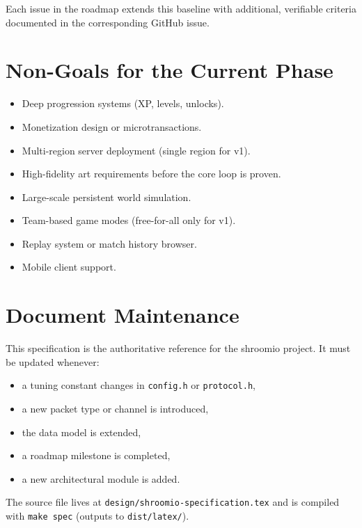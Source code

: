 \documentclass[11pt]{article}
\begin{document}
\noindent Each issue in the roadmap extends this baseline with additional, verifiable criteria documented in the corresponding GitHub issue.

\section{Non-Goals for the Current Phase}

\begin{itemize}
  \item Deep progression systems (XP, levels, unlocks).
  \item Monetization design or microtransactions.
  \item Multi-region server deployment (single region for v1).
  \item High-fidelity art requirements before the core loop is proven.
  \item Large-scale persistent world simulation.
  \item Team-based game modes (free-for-all only for v1).
  \item Replay system or match history browser.
  \item Mobile client support.
\end{itemize}

\section{Document Maintenance}

This specification is the authoritative reference for the shroomio project. It must be updated whenever:

\begin{itemize}
  \item a tuning constant changes in \texttt{config.h} or \texttt{protocol.h},
  \item a new packet type or channel is introduced,
  \item the data model is extended,
  \item a roadmap milestone is completed,
  \item a new architectural module is added.
\end{itemize}

\noindent The source file lives at \texttt{design/shroomio-specification.tex} and is compiled with \texttt{make spec} (outputs to \texttt{dist/latex/}).
\end{document}
